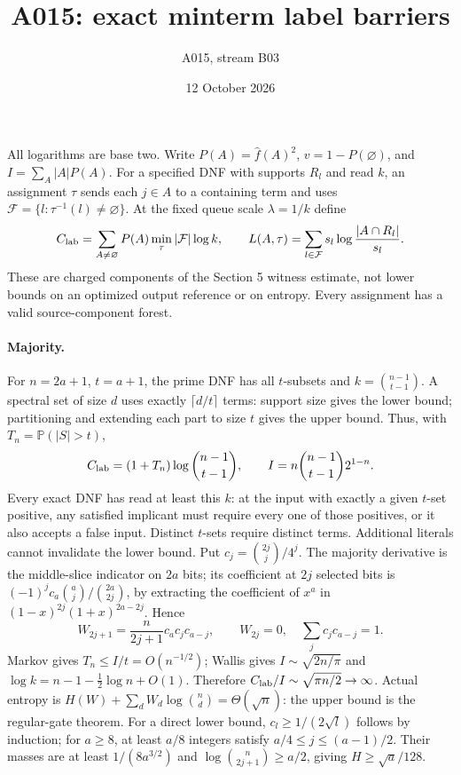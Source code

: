 \documentclass[11pt]{article}
\newcommand{\Prb}{\mathbb P}
\begin{document}
\title{A015: exact minterm label barriers}
\author{A015, stream B03}\date{12 October 2026}\maketitle
All logarithms are base two. Write $P(A)=\widehat f(A)^2$, $v=1-P(\varnothing)$,
and $I=\sum_A |A|P(A)$. For a specified DNF with supports $R_l$ and read $k$,
an assignment $\tau$ sends each $j\in A$ to a containing term and uses
$\mathcal F=\{l:\tau^{-1}(l)\ne\varnothing\}$. At the fixed queue scale $\lambda=1/k$ define
\[
 C_{\rm lab}=\sum_{A\ne\varnothing}P(A)\min_\tau|\mathcal F|\log k,
 \qquad L(A,\tau)=\sum_{l\in\mathcal F}s_l\log\frac{|A\cap R_l|}{s_l}.
\]
These are charged components of the Section 5 witness estimate, not lower bounds
on an optimized output reference or on entropy. Every assignment has a valid source-component forest.

\paragraph{Majority.} For $n=2a+1$, $t=a+1$, the prime DNF has all $t$-subsets and
$k=\binom{n-1}{t-1}$. A spectral set of size $d$ uses exactly $\lceil d/t\rceil$ terms:
support size gives the lower bound; partitioning and extending each part to size $t$ gives the upper bound.
Thus, with $T_n=\Prb(|S|>t)$,
\[
 C_{\rm lab}=(1+T_n)\log\binom{n-1}{t-1},\qquad
 I=n\binom{n-1}{t-1}2^{1-n}.
\]
Every exact DNF has read at least this $k$: at the input with exactly a given $t$-set positive,
any satisfied implicant must require every one of those positives, or it also accepts a false input.
Distinct $t$-sets require distinct terms. Additional literals cannot invalidate the lower bound.
Put $c_j=\binom{2j}{j}/4^j$. The majority derivative is the middle-slice indicator on $2a$ bits;
its coefficient at $2j$ selected bits is
$(-1)^j c_a\binom aj/\binom{2a}{2j}$, by extracting the coefficient of $x^a$ in
$(1-x)^{2j}(1+x)^{2a-2j}$. Hence
\[
 W_{2j+1}=\frac{n}{2j+1}c_a c_jc_{a-j},\qquad W_{2j}=0,
 \quad \sum_j c_jc_{a-j}=1.
\]
Markov gives $T_n\le I/t=O(n^{-1/2})$; Wallis gives $I\sim\sqrt{2n/\pi}$ and
$\log k=n-1-\tfrac12\log n+O(1)$. Therefore
$C_{\rm lab}/I\sim\sqrt{\pi n/2}\to\infty$.
Actual entropy is $H(W)+\sum_d W_d\log\binom nd=\Theta(\sqrt n)$: the upper bound is
the regular-gate theorem. For a direct lower bound, $c_l\ge1/(2\sqrt l)$ follows by induction;
for $a\ge8$, at least $a/8$ integers satisfy $a/4\le j\le(a-1)/2$.
Their masses are at least $1/(8a^{3/2})$ and $\log\binom n{2j+1}\ge a/2$, giving
$H\ge\sqrt a/128$.
\end{document}
